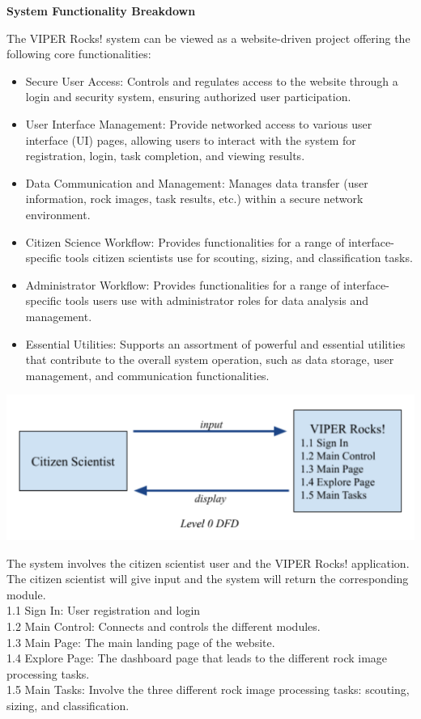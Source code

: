\documentclass{article}
\begin{document}
\textbf{System Functionality Breakdown}

The VIPER Rocks! system can be viewed as a website-driven project offering the following core functionalities:
\begin{itemize}
	\item Secure User Access: Controls and regulates access to the website through a login and security system, ensuring authorized user participation.
	\item User Interface Management: Provide networked access to various user interface (UI) pages, allowing users to interact with the system for registration, login, task completion, and viewing results.
	\item Data Communication and Management: Manages data transfer (user information, rock images, task results, etc.) within a secure network environment.
	\item Citizen Science Workflow: Provides functionalities for a range of interface-specific tools citizen scientists use for scouting, sizing, and classification tasks.
	\item Administrator Workflow: Provides functionalities for a range of interface-specific tools users use with administrator roles for data analysis and management.
	\item Essential Utilities: Supports an assortment of powerful and essential utilities that contribute to the overall system operation, such as data storage, user management, and communication functionalities.
\end{itemize}
\includegraphics{DFD_0}

The system involves the citizen scientist user and the VIPER Rocks! application. The citizen scientist will give input and the system will return the corresponding module. \\
1.1 Sign In: User registration and login \\
1.2 Main Control: Connects and controls the different modules. \\
1.3 Main Page: The main landing page of the website. \\
1.4 Explore Page: The dashboard page that leads to the different rock image processing tasks. \\
1.5 Main Tasks: Involve the three different rock image processing tasks: scouting, sizing, and classification. \\
\end{document}
